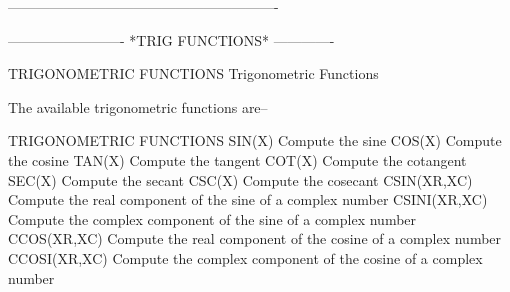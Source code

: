 ----------------------------------------------------------
 
 
 
 
 
 
 
 
 
 
 
 
 
 
 
 
 
 
 
 
 
 
 
 
 
 
 
 
 
 
 
 
 
 
 
 
 
 
 
 
 
 
 
 
 
 
 
 
 
 
 
 
 
 
 
 
 
 
 
 
 
 
 
 
 
 
 
 
 
 
 
 
 
 
 
 
 
 
 
 
 
 
 
 
 
 
 
-------------------------  *TRIG FUNCTIONS*  -------------
 
TRIGONOMETRIC FUNCTIONS
Trigonometric Functions
 
The available trigonometric functions are--
 
TRIGONOMETRIC FUNCTIONS
   SIN(X)        Compute the sine
   COS(X)        Compute the cosine
   TAN(X)        Compute the tangent
   COT(X)        Compute the cotangent
   SEC(X)        Compute the secant
   CSC(X)        Compute the cosecant
   CSIN(XR,XC)    Compute the real component of the sine of a
                  complex number
   CSINI(XR,XC)   Compute the complex component of the sine of a
                  complex number
   CCOS(XR,XC)    Compute the real component of the cosine of a
                  complex number
   CCOSI(XR,XC)   Compute the complex component of the cosine of a
                  complex number
 
